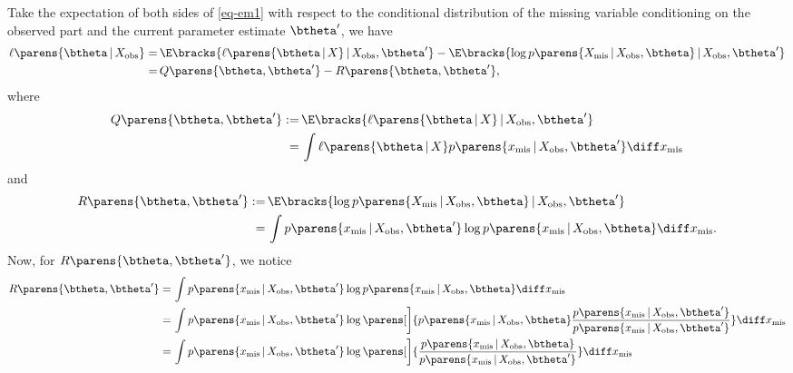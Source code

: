 \documentclass[12pt]{article}
\begin{document}
\begin{enumerate}[label=\textbf{\arabic*.}]
	Take the expectation of both sides of \eqref{eq-em1} with respect to the conditional distribution of the missing variable conditioning on the observed part and the current parameter estimate $\btheta'$, %
	we have 
	\begin{align*}
		\ell \parens{\btheta \,\vert\, X_{\mathrm{obs}}} = & \, \E \bracks{\ell \parens{\btheta \,\vert\, X} \,\vert\, X_{\mathrm{obs}}, \btheta'} - \E \bracks{ \log p \parens{X_{\mathrm{mis}} \,\vert\, X_{\mathrm{obs}}, \btheta} \,\vert\, X_{\mathrm{obs}}, \btheta'} \\ 
		= & \, Q \parens{\btheta, \btheta'} - R \parens{\btheta, \btheta'}, 
	\end{align*}
	where
	\begin{align*}
		Q \parens{\btheta, \btheta'} := & \, \E \bracks{\ell \parens{\btheta \,\vert\, X} \,\vert\, X_{\mathrm{obs}}, \btheta'} \\ 
		= & \, \int \ell \parens{\btheta \,\vert\, X} p \parens{x_{\mathrm{mis}} \,\vert\, X_{\mathrm{obs}}, \btheta'} \diff x_{\mathrm{mis}}
	\end{align*}
	and 
	\begin{align*}
		R \parens{\btheta, \btheta'} := & \, \E \bracks{ \log p \parens{X_{\mathrm{mis}} \,\vert\, X_{\mathrm{obs}}, \btheta} \,\vert\, X_{\mathrm{obs}}, \btheta'} \\ 
		= & \, \int p \parens{x_{\mathrm{mis}} \,\vert\, X_{\mathrm{obs}}, \btheta'} \log p \parens{x_{\mathrm{mis}} \,\vert\, X_{\mathrm{obs}}, \btheta}  \diff x_{\mathrm{mis}}. 
	\end{align*}
	Now, for $R \parens{\btheta, \btheta'}$, we notice 
	\begin{align*}
		R \parens{\btheta, \btheta'} = & \, \int p \parens{x_{\mathrm{mis}} \,\vert\, X_{\mathrm{obs}}, \btheta'} \log p \parens{x_{\mathrm{mis}} \,\vert\, X_{\mathrm{obs}}, \btheta}  \diff x_{\mathrm{mis}} \\ 
		= & \, \int p \parens{x_{\mathrm{mis}} \,\vert\, X_{\mathrm{obs}}, \btheta'} \log \parens[\bigg]{p \parens{x_{\mathrm{mis}} \,\vert\, X_{\mathrm{obs}}, \btheta} \frac{p \parens{x_{\mathrm{mis}} \,\vert\, X_{\mathrm{obs}}, \btheta'}}{p \parens{x_{\mathrm{mis}} \,\vert\, X_{\mathrm{obs}}, \btheta'}}} \diff x_{\mathrm{mis}} \\ 
		= & \, \int p \parens{x_{\mathrm{mis}} \,\vert\, X_{\mathrm{obs}}, \btheta'} \log \parens[\bigg]{ \frac{p \parens{x_{\mathrm{mis}} \,\vert\, X_{\mathrm{obs}}, \btheta}}{p \parens{x_{\mathrm{mis}} \,\vert\, X_{\mathrm{obs}}, \btheta'}}} \diff x_{\mathrm{mis}} \\ 

\end{align*}
\end{enumerate}
\end{document}
